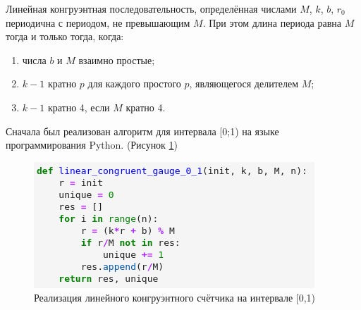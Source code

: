 \documentclass[14pt,fleqn]{extarticle}
\begin{document}
    \newpage
    Линейная конгруэнтная последовательность, определённая числами $M$, $k$, $b$, $r_0$ периодична с периодом, не превышающим $M$. При этом длина периода равна $M$ тогда и только тогда, когда:
    \begin{enumerate}[topsep=0pt,itemsep=-1ex,partopsep=1ex,parsep=1ex]
        \item числа $b$ и $M$ взаимно простые;
        \item $k-1$ кратно $p$ для каждого простого $p$, являющегося делителем $M$;
        \item $k-1$ кратно 4, если $M$ кратно 4.
    \end{enumerate}
    Сначала был реализован алгоритм для интервала [0;1) на языке программирования Python. (Рисунок \ref{fig:linear_congruent_gauge_0_1_code})
    \begin{figure}[h]
        \centering \includegraphics[scale=0.8]{code21}
        \caption{Реализация линейного конгруэнтного счётчика на интервале [0,1)}
        \label{fig:linear_congruent_gauge_0_1_code}
    \end{figure}
\end{document}
